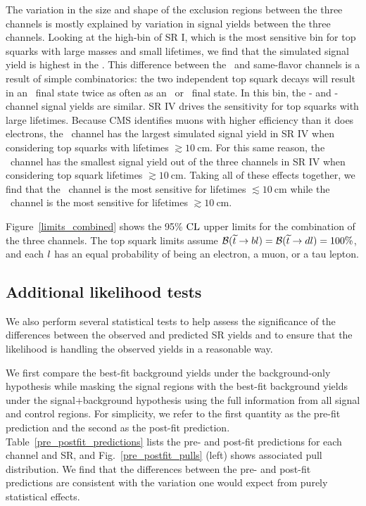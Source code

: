 The variation in the size and shape of the exclusion regions between the three channels is mostly explained by variation in signal yields between the three channels. Looking at the high-\pt bin of SR I, which is the most sensitive bin for top squarks with large masses and small lifetimes, we find that the simulated signal yield is highest in the \Pe\Pgm. This difference between the \Pe\Pgm\ and same-flavor channels is a result of simple combinatorics: the two independent top squark decays will result in an \Pe\Pgm\ final state twice as often as an \Pe\Pe\ or \Pgm\Pgm\ final state. In this bin, the \Pe\Pe- and \Pgm\Pgm-channel signal yields are similar. SR IV drives the sensitivity for top squarks with large lifetimes. Because CMS identifies muons with higher efficiency than it does electrons, the \Pgm\Pgm\ channel has the largest simulated signal yield in SR IV when considering top squarks with lifetimes $\gtrsim\SI{10}{\cm}$. For this same reason, the \Pe\Pe\ channel has the smallest signal yield out of the three channels in SR IV when considering top squark lifetimes $\gtrsim\SI{10}{\cm}$. Taking all of these effects together, we find that the \Pe\Pgm\ channel is the most sensitive for lifetimes ${\lesssim}\SI{10}{\cm}$ while the \Pgm\Pgm\ channel is the most sensitive for lifetimes ${\gtrsim}\SI{10}{\cm}$.

Figure~\ref{limits_combined} shows the 95\% $\text{CL}$ upper limits for the combination of the three channels. The top squark limits assume $\mathcal{B}(\widetilde{t} \to b l)=\mathcal{B}(\widetilde{t} \to d l)=100\%$, and each $l$ has an equal probability of being an electron, a muon, or a tau lepton.



\subsection{Additional likelihood tests}
We also perform several statistical tests to help assess the significance of the differences between the observed and predicted SR yields and to ensure that the likelihood is handling the observed yields in a reasonable way.

We first compare the best-fit background yields under the background-only hypothesis while masking the signal regions with the best-fit background yields under the signal+background hypothesis using the full information from all signal and control regions. For simplicity, we refer to the first quantity as the pre-fit prediction and the second as the post-fit prediction. Table~\ref{pre_postfit_predictions} lists the pre- and post-fit predictions for each channel and SR, and Fig.~\ref{pre_postfit_pulls} (left) shows associated pull distribution. We find that the differences between the pre- and post-fit predictions are consistent with the variation one would expect from purely statistical effects.

